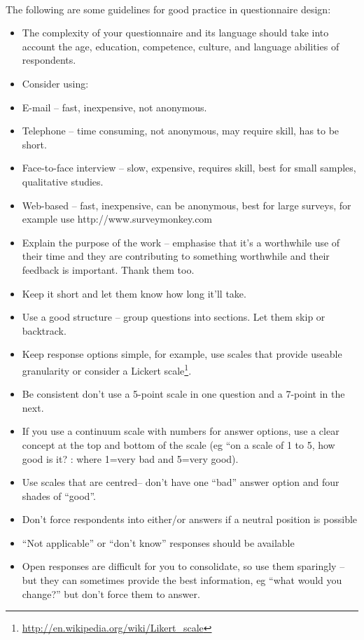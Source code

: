 \documentclass[12pt, a4paper, twoside]{book}
\begin{document}
\paragraph{} The following are some guidelines for good practice in questionnaire design:
\begin{itemize}
\item The complexity of your questionnaire and its language should take into account the age, education, competence, culture, and language abilities of respondents.
\item Consider using:
\item E-mail – fast, inexpensive, not anonymous.
\item Telephone – time consuming, not anonymous, may require skill, has to be short.
\item Face-to-face interview – slow, expensive, requires skill, best for small samples, qualitative studies.
\item Web-based – fast, inexpensive, can be anonymous, best for large surveys, for example use http://www.surveymonkey.com
\item Explain the purpose of the work – emphasise that it’s a worthwhile use of their time and they are contributing to something worthwhile and their feedback is important. Thank them too.
\item Keep it short and let them know how long it’ll take.
\item Use a good structure – group questions into sections. Let them skip or backtrack.
\item Keep response options simple, for example, use scales that provide useable granularity or consider a Lickert scale\footnote{\url{http://en.wikipedia.org/wiki/Likert_scale}}.
\item Be consistent don’t use a 5-point scale in one question and a 7-point in the next.
\item If you use a continuum scale with numbers for answer options, use a clear concept at the top and bottom of the scale (eg “on a scale of 1 to 5, how good is it? : where 1=very bad and 5=very good).
\item Use scales that are centred– don’t have one “bad” answer option and four shades of “good”.
\item Don’t force respondents into either/or answers if a neutral position is possible
\item ``Not applicable'' or ``don’t know'' responses should be available
\item Open responses are difficult for you to consolidate, so use them sparingly – but they can sometimes provide the best information, eg “what would you change?” but don’t force them to answer.
\end{itemize}
\end{document}
